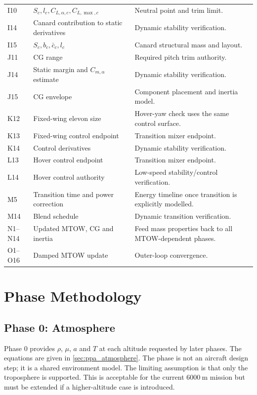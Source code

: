 \begin{longtable}{@{}p{}p{}p{}@{}}
I10 & \(S_c,l_c,C_{L,\alpha,c},C_{L,\max,c}\) & Neutral point and trim limit. \\
I14 & Canard contribution to static derivatives & Dynamic stability verification. \\
I15 & \(S_c,b_c,\bar{c}_c,l_c\) & Canard structural mass and layout. \\
J11 & CG range & Required pitch trim authority. \\
J14 & Static margin and \(C_{m,\alpha}\) estimate & Dynamic stability verification. \\
J15 & CG envelope & Component placement and inertia model. \\
K12 & Fixed-wing elevon size & Hover-yaw check uses the same control surface. \\
K13 & Fixed-wing control endpoint & Transition mixer endpoint. \\
K14 & Control derivatives & Dynamic stability verification. \\
L13 & Hover control endpoint & Transition mixer endpoint. \\
L14 & Hover control authority & Low-speed stability/control verification. \\
M5 & Transition time and power correction & Energy timeline once transition is explicitly modelled. \\
M14 & Blend schedule & Dynamic transition verification. \\
N1--N14 & Updated MTOW, CG and inertia & Feed mass properties back to all MTOW-dependent phases. \\
O1--O16 & Damped MTOW update & Outer-loop convergence. \\
\end{longtable}

\section{Phase Methodology}
\label{sec:ppa_phase_methodology}

\subsection{Phase 0: Atmosphere}
\label{subsec:ppa_phase0}

Phase 0 provides \(\rho\), \(\mu\), \(a\) and \(T\) at each altitude requested by later phases. The equations are given in \autoref{sec:ppa_atmosphere}. The phase is not an aircraft design step; it is a shared environment model. The limiting assumption is that only the troposphere is supported. This is acceptable for the current \(6000~\mathrm{m}\) mission but must be extended if a higher-altitude case is introduced.

